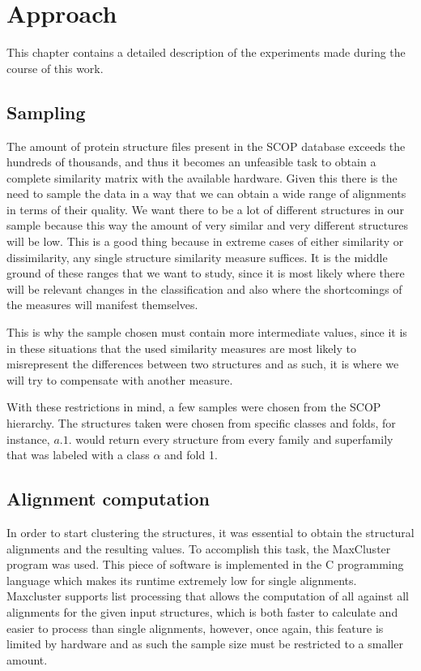 \chapter{Approach}

This chapter contains a detailed description of the experiments made during the course of this work.

\section{Sampling}

The amount of protein structure files present in the SCOP database exceeds the hundreds of thousands, and thus it becomes an unfeasible task to obtain a complete similarity matrix with the available hardware. Given this there is the need to sample the data in a way that we can obtain a wide range of alignments in terms of their quality. We want there to be a lot of different structures in our sample because this way the amount of very similar and very different structures will be low. This is a good thing because in extreme cases of either similarity or dissimilarity, any single structure similarity measure suffices. It is the middle ground of these ranges that we want to study, since it is most likely where there will be relevant changes in the classification and also where the shortcomings of the measures will manifest themselves.

This is why the sample chosen must contain more intermediate values, since it is in these situations that the used similarity measures are most likely to misrepresent the differences between two structures and as such, it is where we will try to compensate with another measure.

With these restrictions in mind, a few samples were chosen from the SCOP hierarchy. The structures taken were chosen from specific classes and folds, for instance, $a.1.$ would return every structure from every family and superfamily that was labeled with a class $\alpha$ and fold 1. 

\section{Alignment computation}

In order to start clustering the structures, it was essential to obtain the structural alignments and the resulting values. To accomplish this task, the MaxCluster program was used. This piece of software is implemented in the C programming language which makes its runtime extremely low for single alignments. Maxcluster supports list processing that allows the computation of all against all alignments for the given input structures, which is both faster to calculate and easier to process than single alignments, however, once again, this feature is limited by hardware and as such the sample size must be restricted to a smaller amount.


